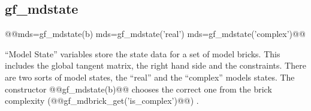 \subsection{gf\_mdstate}
\begin{synopsis}
@@mds=gf_mdstate(\tmdbrick b)
mds=gf_mdstate('real')
mds=gf_mdstate('complex')@@
\end{synopsis}
\begin{cmddescription}
  ``Model State'' variables store the state data for a set of model
  bricks. This includes the global tangent matrix, the right hand side
  and the constraints. There are two sorts of model states, the
  ``real'' and the ``complex'' models states. The constructor
  @@gf_mdstate(b)@@ chooses the correct one from the brick complexity
  (@@gf_mdbrick_get('is_complex')@@) .
\end{cmddescription}
\newpage


